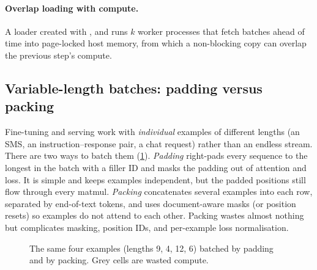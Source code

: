 \paragraph{Overlap loading with compute.} A loader created with ,
 and  runs $k$ worker processes that fetch batches ahead of time into page-locked
host memory, from which a non-blocking  copy can overlap the
previous step's compute.


\subsection{Variable-length batches: padding versus packing}\label{sec:text:padding}
Fine-tuning and serving work with \emph{individual} examples of different lengths (an SMS, an
instruction--response pair, a chat request) rather than an endless stream. There are two ways to
batch them (\cref{fig:text:padpack}). \emph{Padding} right-pads every sequence to the longest in the
batch with a filler ID and masks the padding out of attention and loss. It is simple and keeps
examples independent, but the padded positions still flow through every matmul. \emph{Packing}
concatenates several examples into each row, separated by end-of-text tokens, and uses
document-aware masks (or position resets) so examples do not attend to each other. Packing wastes
almost nothing but complicates masking, position IDs, and per-example loss normalisation.

\begin{figure}[t]
\centering
{}
\caption{The same four examples (lengths 9, 4, 12, 6) batched by padding and by packing. Grey cells
are wasted compute.}
\label{fig:text:padpack}
\end{figure}

